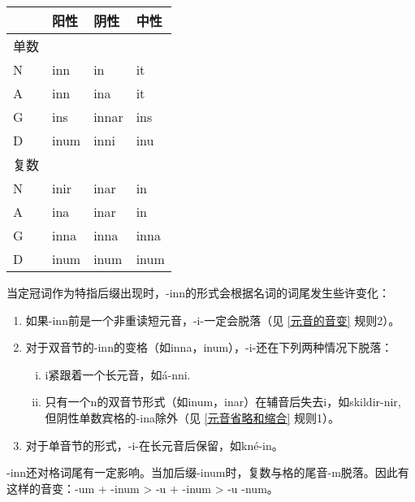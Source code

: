 \begin{longtable}{llll}
  \toprule
       & \textbf{阳性} & \textbf{阴性} & \textbf{中性} \\
  \midrule
  \endhead
  \bottomrule
  \endfoot
  单数 &               &               &               \\
  N    & inn           & in            & it            \\
  A    & inn           & ina           & it            \\
  G    & ins           & innar         & ins           \\
  D    & inum          & inni          & inu           \\
  复数 &               &               &               \\
  N    & inir          & inar          & in            \\
  A    & ina           & inar          & in            \\
  G    & inna          & inna          & inna          \\
  D    & inum          & inum          & inum          \\
\end{longtable}

当定冠词作为特指后缀出现时，-inn的形式会根据名词的词尾发生些许变化：

\begin{info}
  \begin{enumerate}
    \item  如果-inn前是一个非重读短元音，-i-一定会脱落（见 \ref{元音的音变} 规则2）。
    \item  对于双音节的-inn的变格（如inna，inum），-i-还在下列两种情况下脱落：
          \begin{enumerate}[i.]
            \item  i紧跟着一个长元音，如á-nni.
            \item  只有一个n的双音节形式（如inum，inar）在辅音后失去i，如skildir-nir,    但阴性单数宾格的-ina除外（见 \ref{元音省略和缩合} 规则1）。
          \end{enumerate}
    \item  对于单音节的形式，-i-在长元音后保留，如kné-in。
  \end{enumerate}
\end{info}

-inn还对格词尾有一定影响。当加后缀-inum时，复数与格的尾音-m脱落。因此有这样的音变：-um
+ -inum \textgreater{} -u + -inum \textgreater{} -u -num。

